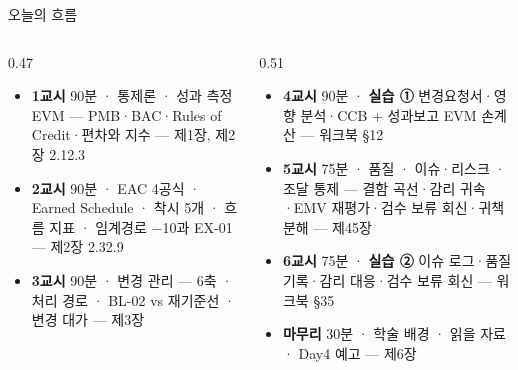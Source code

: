 \begin{frame}{오늘의 흐름}
\begin{columns}[T]
\begin{column}{0.47\textwidth}
\begin{itemize}
\item \textbf{1교시} 90분 · 통제론 · 성과 측정 EVM — PMB·BAC·Rules of Credit·편차와 지수 — 제1장, 제2장 2.1\til{}2.3
\item \textbf{2교시} 90분 · EAC 4공식 · Earned Schedule · 착시 5개 · 흐름 지표 · 임계경로 $-$10과 EX-01 — 제2장 2.3\til{}2.9
\item \textbf{3교시} 90분 · 변경 관리 — 6축 · 처리 경로 · BL-02 vs 재기준선 · 변경 대가 — 제3장
\end{itemize}
\end{column}
\begin{column}{0.51\textwidth}
\begin{itemize}
\item \textbf{4교시} 90분 · \textbf{실습 ①} 변경요청서·영향 분석·CCB + 성과보고 EVM 손계산 — 워크북 §1\til{}2
\item \textbf{5교시} 75분 · 품질 · 이슈·리스크 · 조달 통제 — 결함 곡선·감리 귀속·EMV 재평가·검수 보류 회신·귀책 분해 — 제4\til{}5장
\item \textbf{6교시} 75분 · \textbf{실습 ②} 이슈 로그·품질 기록·감리 대응·검수 보류 회신 — 워크북 §3\til{}5
\item \textbf{마무리} 30분 · 학술 배경 · 읽을 자료 · Day4 예고 — 제6장
\end{itemize}
\end{column}
\end{columns}
\end{frame}

